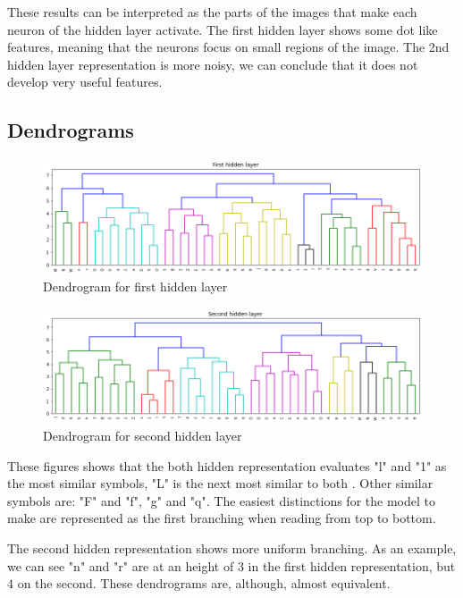 \documentclass[a4paper, 11pt]{article}
\begin{document}
			These results can be interpreted as the parts of the images that make each neuron of the hidden layer activate.
			The first hidden layer shows some dot like features, meaning that the neurons focus on small regions of the image.
			The 2nd hidden layer representation is more noisy, we can conclude that it does not develop very useful features.
		
		\subsection{Dendrograms}
		
			\begin{figure}[H]
				\centering
				\includegraphics[width=.8\linewidth]{dend1.png}  
				\caption{Dendrogram for first hidden layer}
				\label{fig:dend1}
			\end{figure}
		
			\begin{figure}[H]
				\centering
				\includegraphics[width=.8\linewidth]{dend2.png}  
				\caption{Dendrogram for second hidden layer}
				\label{fig:dend2}
			\end{figure}
		
			 These figures shows that the both hidden representation evaluates "l" and "1" as the most similar symbols, "L" is the next most similar to both \cite{Dends}.
			 Other similar symbols are: "F" and "f", "g" and "q".
			 The easiest distinctions for the model to make are represented as the first branching when reading from top to bottom.
			 
			 The second hidden representation shows more uniform branching.
			 As an example, we can see "n" and "r" are at an height of $ 3 $ in the first hidden representation, but $ 4 $ on the second.
			 These dendrograms are, although, almost equivalent.
			 
\end{document}
